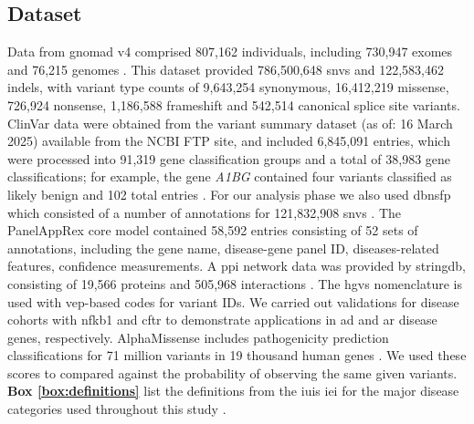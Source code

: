 \subsection{Dataset}

Data from \ac{gnomad} v4 comprised 807,162 individuals, including 730,947 exomes and 76,215 genomes \cite{karczewski2020mutational}. This dataset provided 786,500,648 \ac{snv}s and 122,583,462 \ac{indel}s, with variant type counts of 9,643,254 synonymous, 16,412,219 missense, 726,924 nonsense, 1,186,588 frameshift and 542,514 canonical splice site variants. ClinVar data were obtained from the variant summary dataset (as of: 16 March 2025) available from the NCBI FTP site, and included 6,845,091 entries, which were processed into 91,319 gene classification groups and a total of 38,983 gene classifications; for example, the gene \textit{A1BG} contained four variants classified as likely benign and 102 total entries \cite{landrum_clinvar_2018}. For our analysis phase we also used \ac{dbnsfp} which consisted of a number of annotations for 121,832,908 \ac{snv}s 
\cite{liu_dbnsfp_2020}. 
The PanelAppRex core model contained 58,592 entries consisting of 52 sets of annotations, including the gene name, disease-gene panel ID, diseases-related features, confidence measurements.
\cite{lawless_panelapprex_2025}
A \ac{ppi} network data was provided by \ac{stringdb}, consisting of 19,566 proteins and 505,968 interactions \cite{szklarczyk2025string}.
The \ac{hgvs} nomenclature is used with \ac{vep}-based codes for variant IDs.
We carried out validations for disease cohorts with \ac{nfkb1} 
\cite{tuijnenburgNFKB12018,
who1997primary,
cunningham1999common,
oksenhendler2008infections}
and \ac{cftr} 
\cite{naito2023uk, castellani2013cftr2, Grasemann2023cftr}
to demonstrate applications in \ac{ad} and \ac{ar} disease genes, respectively.
AlphaMissense includes pathogenicity prediction classifications for 71 million variants in 19 thousand human genes \cite{cheng_accurate_2023, jun_cheng_2023_8208688}. We used these scores to compared against the probability of observing the same given variants.
\textbf{Box \ref{box:definitions}} list the definitions from the \ac{iuis} \ac{iei} for the major disease categories used throughout this study \cite{tangye_human_2022}.

